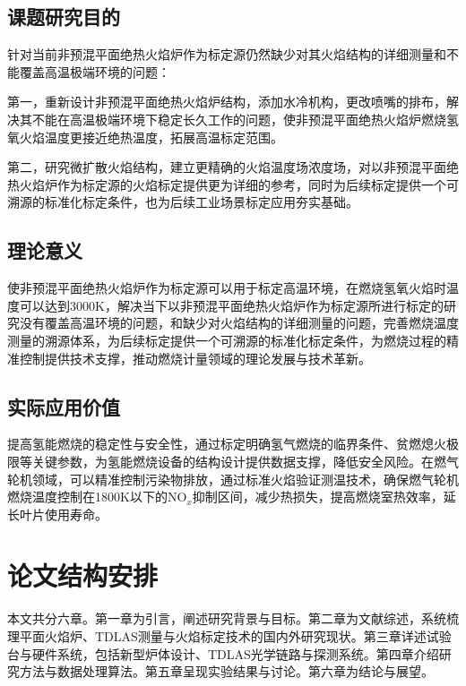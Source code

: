 \subsection{课题研究目的}

针对当前非预混平面绝热火焰炉作为标定源仍然缺少对其火焰结构的详细测量和不能覆盖高温极端环境的问题：

第一，重新设计非预混平面绝热火焰炉结构，添加水冷机构，更改喷嘴的排布，解决其不能在高温极端环境下稳定长久工作的问题，使非预混平面绝热火焰炉燃烧氢氧火焰温度更接近绝热温度，拓展高温标定范围。

第二，研究微扩散火焰结构，建立更精确的火焰温度场浓度场，对以非预混平面绝热火焰炉作为标定源的火焰标定提供更为详细的参考，同时为后续标定提供一个可溯源的标准化标定条件，也为后续工业场景标定应用夯实基础。

\subsection{理论意义}

使非预混平面绝热火焰炉作为标定源可以用于标定高温环境，在燃烧氢氧火焰时温度可以达到3000K，解决当下以非预混平面绝热火焰炉作为标定源所进行标定的研究没有覆盖高温环境的问题，和缺少对火焰结构的详细测量的问题，完善燃烧温度测量的溯源体系，为后续标定提供一个可溯源的标准化标定条件，为燃烧过程的精准控制提供技术支撑，推动燃烧计量领域的理论发展与技术革新。

\subsection{实际应用价值}

提高氢能燃烧的稳定性与安全性，通过标定明确氢气燃烧的临界条件、贫燃熄火极限等关键参数，为氢能燃烧设备的结构设计提供数据支撑，降低安全风险。在燃气轮机领域，可以精准控制污染物排放，通过标准火焰验证测温技术，确保燃气轮机燃烧温度控制在1800K以下的NO$_x$抑制区间，减少热损失，提高燃烧室热效率，延长叶片使用寿命。

\section{论文结构安排}

本文共分六章。第一章为引言，阐述研究背景与目标。第二章为文献综述，系统梳理平面火焰炉、TDLAS测量与火焰标定技术的国内外研究现状。第三章详述试验台与硬件系统，包括新型炉体设计、TDLAS光学链路与探测系统。第四章介绍研究方法与数据处理算法。第五章呈现实验结果与讨论。第六章为结论与展望。
